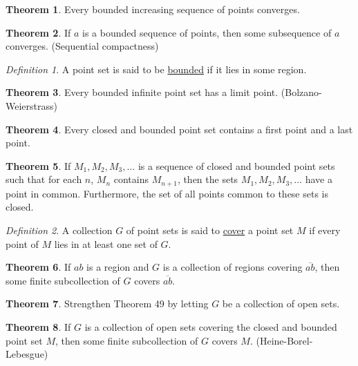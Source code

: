 \documentclass[12pt, oneside, letter] {amsart}
\theoremstyle {definition}
\newtheorem {thm} {Theorem}
\theoremstyle {remark}
\newtheorem* {defn} {Definition}
\begin{document}
\begin{thm}
  Every bounded increasing sequence of points converges.
\end{thm}

\begin{thm}
  If $a$ is a bounded sequence of points, then some subsequence of $a$
  converges. (Sequential compactness)
\end{thm}

\begin{defn}
  A point set is said to be \underline {bounded} if it lies in some
  region.
\end{defn}

\begin{thm}
  Every bounded infinite point set has a limit point.
  (Bolzano-Weierstrass)
\end{thm}

\begin{thm}
  Every closed and bounded point set contains a first point and a last
  point.
\end{thm}

\begin{thm}
  If $M_1, M_2, M_3, \dots$ is a sequence of closed and bounded point
  sets such that for each $n$, $M_n$ contains $M_{n+1}$, then the sets
  $M_1, M_2, M_3, \dots$ have a point in common. Furthermore, the set
  of all points common to these sets is closed.
\end{thm}

\begin{defn}
  A collection $G$ of point sets is said to \underline {cover} a point
  set $M$ if every point of $M$ lies in at least one set of $G$.
\end{defn}

\begin{thm}
  If $ab$ is a region and $G$ is a collection of regions covering
  $\overline {ab}$, then some finite subcollection of $G$ covers
  $\overline{ab}$.
\end{thm}

\begin{thm}
  Strengthen Theorem 49 by letting $G$ be a collection of open sets.
\end{thm}

\begin{thm}
  If $G$ is a collection of open sets covering the closed and bounded
  point set $M$, then some finite subcollection of $G$ covers $M$.
  (Heine-Borel-Lebesgue)
\end{thm}
\end{document}
